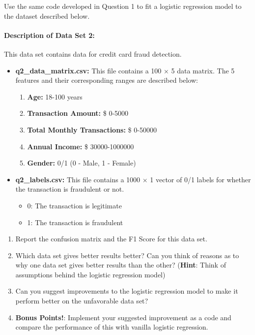 \documentclass[11pt]{article}
\providecommand{\tightlist}{%
      \setlength{\itemsep}{0pt}\setlength{\parskip}{0pt}}
\begin{document}
    Use the same code developed in Question 1 to fit a logistic regression
model to the dataset described below.

    \hypertarget{description-of-data-set-2}{%
\paragraph{Description of Data Set 2:}\label{description-of-data-set-2}}

    This data set contains data for credit card fraud detection.

\begin{itemize}
\item
  \textbf{q2\_data\_matrix.csv:} This file contains a 100 × 5 data
  matrix. The 5 features and their corresponding ranges are described
  below:

  \begin{enumerate}
  \def\labelenumi{\arabic{enumi}.}
  \tightlist
  \item
    \textbf{Age:} 18-100 years
  \item
    \textbf{Transaction Amount:} \$ 0-5000
  \item
    \textbf{Total Monthly Transactions:} \$ 0-50000
  \item
    \textbf{Annual Income:} \$ 30000-1000000
  \item
    \textbf{Gender:} 0/1 (0 - Male, 1 - Female)
  \end{enumerate}
\item
  \textbf{q2\_labels.csv:} This file contains a 1000 × 1 vector of 0/1
  labels for whether the transaction is fraudulent or not.

  \begin{itemize}
  \tightlist
  \item
    0: The transaction is legitimate
  \item
    1: The transaction is fraudulent
  \end{itemize}
\end{itemize}

\begin{enumerate}
\def\labelenumi{\arabic{enumi}.}
\tightlist
\item
  Report the confusion matrix and the F1 Score for this data set.
\item
  Which data set gives better results better? Can you think of reasons
  as to why one data set gives better results than the other?
  (\textbf{Hint}: Think of assumptions behind the logistic regression
  model)
\item
  Can you suggest improvements to the logistic regression model to make
  it perform better on the unfavorable data set?
\item
  \textbf{Bonus Points!}: Implement your suggested improvement as a code
  and compare the performance of this with vanilla logistic regression.
\end{enumerate}
\end{document}

